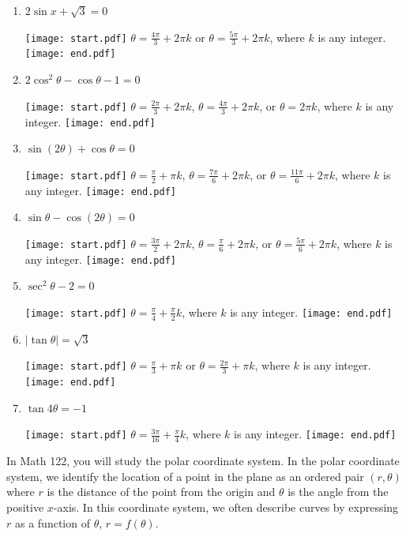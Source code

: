 \documentclass[12pt]{article}
\begin{document}
\begin{enumerate}

\item $2\sin{x}+\sqrt{3}=0$

\texttt{[image: start.pdf]}
{$\theta=\frac{4\pi}{3}+2\pi k$ or $\theta=\frac{5\pi}{3}+2\pi k$, where $k$ is any integer.}
\texttt{[image: end.pdf]}


\item $2\cos^2\theta-\cos\theta-1=0$

\texttt{[image: start.pdf]}
{$\theta=\frac{2\pi}{3}+2\pi k$, $\theta=\frac{4\pi}{3}+2\pi k$, or $\theta=2\pi k$, where $k$ is any integer.}
\texttt{[image: end.pdf]}


\item $\sin(2\theta)+\cos{\theta}=0$

\texttt{[image: start.pdf]}
{$\theta=\frac{\pi}{2}+\pi k$, $\theta=\frac{7\pi}{6}+2\pi k$, or $\theta=\frac{11\pi}{6}+2\pi k$, where $k$ is any integer.}
\texttt{[image: end.pdf]}


\item $\sin\theta-\cos{(2\theta)}=0$

\texttt{[image: start.pdf]}
{$\theta=\frac{3\pi}{2}+2\pi k$, $\theta=\frac{\pi}{6}+2\pi k$, or $\theta=\frac{5\pi}{6}+2\pi k$, where $k$ is any integer.}
\texttt{[image: end.pdf]}


\item $\sec^2\theta-2=0$

\texttt{[image: start.pdf]}
{$\theta=\frac{\pi}{4}+\frac{\pi}{2}k$, where $k$ is any integer.}
\texttt{[image: end.pdf]}


\item $\left|\tan{\theta}\right|=\sqrt{3}$

\texttt{[image: start.pdf]}
{$\theta=\frac{\pi}{3}+\pi k$ or $\theta=\frac{2\pi}{3}+\pi k$, where $k$ is any integer.}
\texttt{[image: end.pdf]}


\item $\tan{4\theta}=-1$

\texttt{[image: start.pdf]}
{$\theta=\frac{3\pi}{16}+\frac{\pi}{4}k$, where $k$ is any integer.}
\texttt{[image: end.pdf]}


\end{enumerate}

In Math 122, you will study the polar coordinate system.  In the polar coordinate system, we identify the location of a point in the plane as an ordered pair $(r,\theta)$ where $r$ is the distance of the point from the origin and $\theta$ is the angle from the positive $x$-axis.  In this coordinate system, we often describe curves by expressing $r$ as a function of $\theta$, $r=f(\theta)$.
\end{document}
